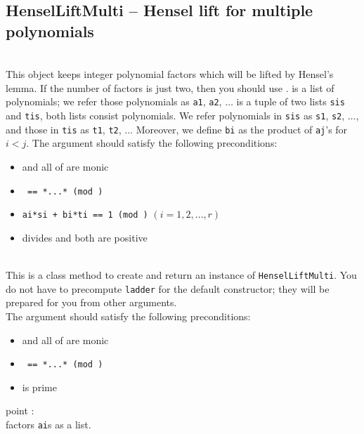 \subsection{HenselLiftMulti -- Hensel lift for multiple polynomials}
 \initialize
  \\
  \spacing
  \quad This object keeps integer polynomial factors which will be lifted by Hensel's lemma.
  If the number of factors is just two, then you should use .
  \spacing
  \quad {} is a list of polynomials;
  we refer those polynomials as {\tt a1}, {\tt a2}, \(\ldots\)
   is a tuple of two lists {\tt sis} and {\tt tis},
  both lists consist polynomials.
  We refer polynomials in {\tt sis} as {\tt s1}, {\tt s2}, \(\ldots\),
  and those in {\tt tis} as {\tt t1}, {\tt t2}, \(\ldots\)
  Moreover, we define {\tt bi} as the product of {\tt aj}'s for
  \(i < j\).
  \quad The argument should satisfy the following preconditions:
  \begin{itemize}
  \item {} and all of  are monic
  \item {\tt {} == *...* (mod )}
  \item {\tt ai*si + bi*ti == 1 (mod )} \((i = 1,2,\ldots,r)\)
  \item {} divides  and both are positive
  \end{itemize}
%
  \\
  \spacing
  \quad This is a class method to create and return an instance of {\tt HenselLiftMulti}.
  You do not have to precompute {\tt ladder} for the default constructor; they will be prepared for you from other arguments.\\
  \spacing
  \quad The argument should satisfy the following preconditions:
  \begin{itemize}
  \item {} and all of  are monic
  \item {\tt {} == *...* (mod )}
  \item {} is prime
  \end{itemize}
  \begin{at}
    \item[point]:\\
      factors {\tt ai}s as a list.
  \end{at}
  \method
